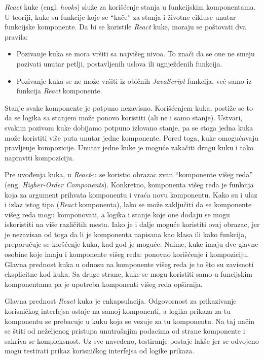 \textit{React} kuke (engl. \textit{hooks}) služe za korišćenje stanja u funkcijskim komponentama. U teoriji, kuke su funkcije 
koje se “kače” za stanja i životne cikluse unutar funkcijske komponente. Da bi se koristile \textit{React} kuke, moraju se 
poštovati dva pravila:
\begin{itemize}
    \item Pozivanje kuka se mora vršiti sa najvišeg nivoa. To znači da se one ne smeju pozivati unutar petlji, 
    postavljenih uslova ili ugnježdenih funkcija.
    \item Pozivanje kuka se ne može vršiti iz običnih \textit{JavaScript} funkcija, već samo iz funkcija \textit{React} komponente.
\end{itemize}

Stanje svake komponente je potpuno nezavisno. Korišćenjem kuka, postiže se to da se logika sa stanjem može ponovo koristiti 
(ali ne i samo stanje). Ustvari, svakim pozivom kuke dobijamo potpuno izlovano stanje, pa se stoga jedna kuka može koristiti 
više puta unutar jedne komponente. Pored toga, kuke omogućavaju pravljenje kompozicije. Unutar jedne kuke je moguće zakačiti 
drugu kuku i tako napraviti kompoziciju. 

Pre uvođenja kuka, u \textit{React}-u se koristio obrazac zvan “komponente višeg reda” (eng. \textit{Higher-Order Components}). 
Konkretno, komponenta višeg reda je funkcija koja za argument prihvata komponentu i vraća novu komponentu. Kako su i ulaz i 
izlaz istog tipa (\textit{React} komponenta), lako se može zaključiti da se komponente višeg reda mogu komponovati, a logika i 
stanje koje one dodaju se mogu iskoristiti na više različitih mesta. Iako je i dalje moguće koristiti ovaj obrazac, jer je 
nezavisan od toga da li je komponenta napisana kao klasa ili kako funkcija, preporučuje se koršćenje kuka, kad god je moguće. 
Naime, kuke imaju dve glavne osobine koje imaju i komponente višeg reda: ponovno korišćenje i kompoziciju. Glavna prednost kuka 
u odnosu na komponente višeg reda je to što su zavisnoti eksplicitne kod kuka. Sa druge strane, kuke se mogu koristiti samo u 
funcijskim komponentama pa je upotreba komponenti višeg reda opširnija.

Glavna prednost \textit{React} kuka je enkapsulacija. Odgovornost za prikazivanje korisničkog interfejsa ostaje na samoj 
komponenti, a logika prikaza za tu komponentu se prebacuje u kuku koja se vezuje za tu komponentu. Na taj način se štiti 
od neželjenog pristupa unutrašnjim podacima od strane komponente i sakriva se kompleksnost. Uz sve navedeno, 
testiranje postaje lakše jer se odvojeno mogu testirati prikaz korisničkog interfejsa od logike prikaza. 

